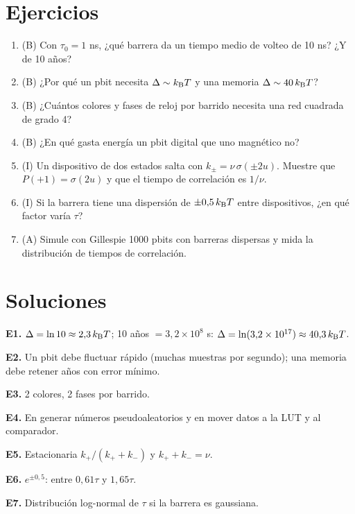 \documentclass[11pt,a4paper]{article}
\begin{document}
\section{Ejercicios}
\begin{enumerate}[label=\textbf{E\arabic*.}]
\item (B) Con $\tau_0=1$ ns, ¿qué barrera da un tiempo medio de volteo de 10 ns? ¿Y de 10 años?
\item (B) ¿Por qué un pbit necesita $\Delta\sim k_{\mathrm B} T$ y una memoria $\Delta\sim40\,k_{\mathrm B} T$?
\item (B) ¿Cuántos colores y fases de reloj por barrido necesita una red cuadrada de grado 4?
\item (B) ¿En qué gasta energía un pbit digital que uno magnético no?
\item (I) Un dispositivo de dos estados salta con $k_\pm=\nu\,\sigma(\pm2u)$. Muestre que $P(+1)=\sigma(2u)$ y que el tiempo de correlación es $1/\nu$.
\item (I) Si la barrera tiene una dispersión de $\pm0{,}5\,k_{\mathrm B} T$ entre dispositivos, ¿en qué factor varía $\tau$?
\item (A) Simule con Gillespie 1000 pbits con barreras dispersas y mida la distribución de tiempos de correlación.
\end{enumerate}
\section{Soluciones}
\begin{solucion}
\textbf{E1.} $\Delta=\ln10\approx2{,}3\,k_{\mathrm B} T$; 10 años $=3{,}2\times10^8$ s: $\Delta=\ln(3{,}2\times10^{17})\approx40{,}3\,k_{\mathrm B} T$.

\textbf{E2.} Un pbit debe fluctuar rápido (muchas muestras por segundo); una memoria debe retener años con error mínimo.

\textbf{E3.} 2 colores, 2 fases por barrido.

\textbf{E4.} En generar números pseudoaleatorios y en mover datos a la LUT y al comparador.

\textbf{E5.} Estacionaria $k_+/(k_++k_-)$ y $k_++k_-=\nu$.

\textbf{E6.} $e^{\pm0{,}5}$: entre $0{,}61\tau$ y $1{,}65\tau$.

\textbf{E7.} Distribución log-normal de $\tau$ si la barrera es gaussiana.
\end{solucion}
\end{document}

